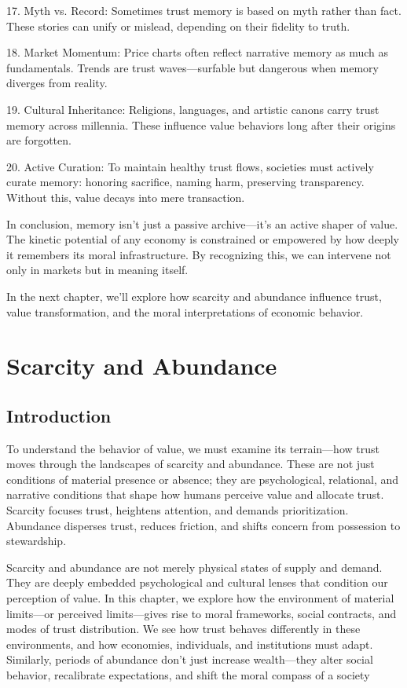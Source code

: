 \documentclass[11pt,oneside]{book}
\begin{document}
17. Myth vs. Record: Sometimes trust memory is based on myth rather than fact. These stories can unify or mislead, depending on their fidelity to truth.



18. Market Momentum: Price charts often reflect narrative memory as much as fundamentals. Trends are trust waves—surfable but dangerous when memory diverges from reality.



19. Cultural Inheritance: Religions, languages, and artistic canons carry trust memory across millennia. These influence value behaviors long after their origins are forgotten.



20. Active Curation: To maintain healthy trust flows, societies must actively curate memory: honoring sacrifice, naming harm, preserving transparency. Without this, value decays into mere transaction.


In conclusion, memory isn’t just a passive archive—it’s an active shaper of value. The kinetic potential of any economy is constrained or empowered by how deeply it remembers its moral infrastructure. By recognizing this, we can intervene not only in markets but in meaning itself.

In the next chapter, we’ll explore how scarcity and abundance influence trust, value transformation, and the moral interpretations of economic behavior.


\chapter{ Scarcity and Abundance}

\section{Introduction}

To understand the behavior of value, we must examine its terrain—how trust moves through the landscapes of scarcity and abundance. These are not just conditions of material presence or absence; they are psychological, relational, and narrative conditions that shape how humans perceive value and allocate trust. Scarcity focuses trust, heightens attention, and demands prioritization. Abundance disperses trust, reduces friction, and shifts concern from possession to stewardship.

Scarcity and abundance are not merely physical states of supply and demand. They are deeply embedded psychological and cultural lenses that condition our perception of value. In this chapter, we explore how the environment of material limits—or perceived limits—gives rise to moral frameworks, social contracts, and modes of trust distribution. We see how trust behaves differently in these environments, and how economies, individuals, and institutions must adapt. Similarly, periods of abundance don't just increase wealth—they alter social behavior, recalibrate expectations, and shift the moral compass of a society
\end{document}
